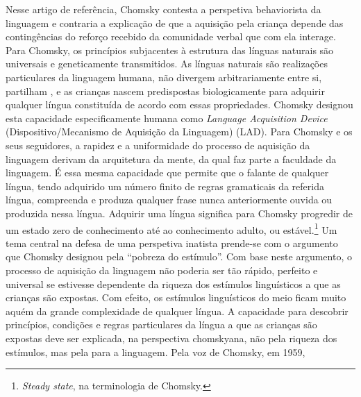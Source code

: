 \documentclass[output=paper]{LSP/langsci}
\begin{document}
Nesse artigo de referência, Chomsky contesta a perspetiva behaviorista da linguagem e contraria a explicação de que a aquisição pela criança depende das contingências do reforço recebido da comunidade verbal que com ela interage. Para Chomsky, os princípios subjacentes à estrutura das línguas naturais são universais e geneticamente transmitidos. As línguas naturais são realizações particulares da linguagem humana, não divergem arbitrariamente entre si, partilham , e as crianças nascem predispostas biologicamente para adquirir qualquer língua constituída de acordo com essas propriedades. Chomsky designou esta capacidade especificamente humana como \emph{Language Acquisition Device}  (Dispositivo/Mecanismo de Aquisição da Linguagem) (LAD). Para Chomsky e os seus seguidores, a rapidez e a uniformidade do processo de aquisição da linguagem derivam da arquitetura da mente, da qual faz parte a faculdade da linguagem. É essa mesma capacidade que permite que o falante de qualquer língua, tendo adquirido um número finito de regras gramaticais da referida língua, compreenda e produza qualquer frase nunca anteriormente ouvida ou produzida nessa língua. Adquirir uma língua significa para Chomsky progredir de um estado zero de conhecimento até ao conhecimento adulto, ou estável.\footnote{\textit{Steady state}, na terminologia de Chomsky.} Um tema central na defesa de uma perspetiva inatista prende-se com o argumento que Chomsky designou pela ``pobreza do estímulo''. Com base neste argumento, o processo de aquisição da linguagem não poderia ser tão rápido, perfeito e universal se estivesse dependente da riqueza dos estímulos linguísticos a que as crianças são expostas. Com efeito, os estímulos linguísticos do meio ficam muito aquém da grande complexidade de qualquer língua. A capacidade para descobrir princípios, condições e regras particulares da língua a que as crianças são expostas deve ser explicada, na perspectiva chomskyana, não pela riqueza dos estímulos, mas pela  para a linguagem.  Pela voz de Chomsky, em 1959,
\end{document}
